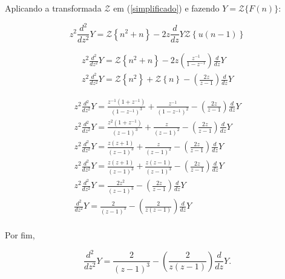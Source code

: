 \documentclass[a4paper,10pt]{article}
\begin{document}
Aplicando a transformada  $\mathcal{Z}$ em (\ref{simplificado}) e fazendo $ Y = \mathcal{Z} \{ F(n) \} $:

$$
 z^2 \displaystyle \frac{d^2}{dz^2}Y = \mathcal{Z} \left\{ n^2 + n  \right\} - 2 z  
 \displaystyle \frac{d}{dz}Y \mathcal{Z} \left\{u(n-1)\right\}
$$

$$
\begin{array}{lcl} 
 z^2 \displaystyle \frac{d^2}{dz^2}Y = \mathcal{Z} \left\{ n^2 + n \right\} - 2 z   
 \left( \displaystyle \frac{z^{-1}}{1 - z^{-1}} \right) \displaystyle \frac{d}{dz}Y \\
 z^2 \displaystyle \frac{d^2}{dz^2}Y = \mathcal{Z} \left\{ n^2  \right\} + 
 \mathcal{Z} \left\{ n \right\} -  \left( \displaystyle \frac{2z}{z - 1} \right) \displaystyle \frac{d}{dz}Y
\end{array}  
$$

$$
\begin{array}{lcl} 
z^2 \displaystyle \frac{d^2}{dz^2}Y = \frac{z^{-1} (1 + z^{-1})}{(1 - z^{-1})^3} + 
 \frac{z^{-1}}{(1 - z^{-1})^2} -  \left( \displaystyle \frac{2z}{z - 1} \right) \displaystyle \frac{d}{dz}Y \\
 z^2 \displaystyle \frac{d^2}{dz^2}Y = \frac{z^2 (1 + z^{-1})}{(z - 1)^3} + 
 \frac{z}{(z - 1)^2} -  \left( \displaystyle \frac{2z}{z - 1} \right) \displaystyle \frac{d}{dz}Y \\
 z^2 \displaystyle \frac{d^2}{dz^2}Y = \frac{z(z + 1)}{(z - 1)^3} + 
 \frac{z}{(z - 1)^2} -  \left( \displaystyle \frac{2z}{z - 1} \right) \displaystyle \frac{d}{dz}Y \\
 z^2 \displaystyle \frac{d^2}{dz^2}Y = \frac{z(z + 1)}{(z - 1)^3} + 
 \frac{z(z - 1)}{(z - 1)^3} -  \left( \displaystyle \frac{2z}{z - 1} \right) \displaystyle \frac{d}{dz}Y \\
 z^2 \displaystyle \frac{d^2}{dz^2}Y = \frac{2z^2}{(z - 1)^3} -  \left( \displaystyle \frac{2z}{z - 1} \right) \displaystyle \frac{d}{dz}Y \\
 \displaystyle \frac{d^2}{dz^2}Y = \frac{2}{(z - 1)^3} -  \left( \displaystyle \frac{2}{z(z - 1)} \right) \displaystyle \frac{d}{dz}Y \\
\end{array}  
$$

Por fim,

\begin{equation}
 \displaystyle \frac{d^2}{dz^2}Y = \frac{2}{(z - 1)^3} -  \left( \displaystyle \frac{2}{z(z - 1)} \right) \displaystyle \frac{d}{dz}Y.
 \label{equacao.diferencial}
\end{equation}
\end{document}
